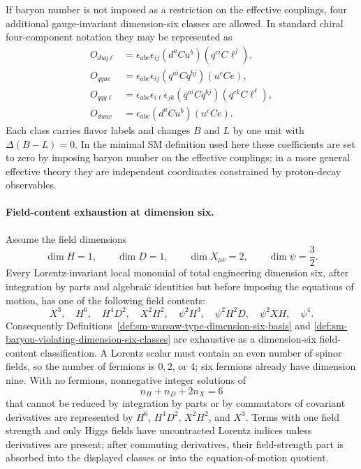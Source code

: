 \begin{definition}
\label{def:sm-baryon-violating-dimension-six-classes}
If baryon number is not imposed as a restriction on the effective couplings,
four additional gauge-invariant dimension-six classes are allowed.  In
standard chiral four-component notation they may be represented as
\[
\begin{aligned}
  O_{duq\ell}&=
  \epsilon_{abc}\epsilon_{ij}
  (d^a C u^b)(q^{ci}C\ell^j),\\
  O_{qque}&=
  \epsilon_{abc}\epsilon_{ij}
  (q^{ai}Cq^{bj})(u^cCe),\\
  O_{qqq\ell}&=
  \epsilon_{abc}\epsilon_{i\ell}\epsilon_{jk}
  (q^{ai}Cq^{bj})(q^{ck}C\ell^\ell),\\
  O_{duue}&=
  \epsilon_{abc}(d^aCu^b)(u^cCe).
\end{aligned}
\]
Each class carries flavor labels and changes \(B\) and \(L\) by one unit
with \(\Delta(B-L)=0\).  In the minimal SM definition used here these
coefficients are set to zero by imposing baryon number on the effective
couplings; in a more general effective theory they are independent
coordinates constrained by proton-decay observables.
\end{definition}

\paragraph{Field-content exhaustion at dimension six.}
Assume the field dimensions
\[
  \dim H=1,\qquad \dim D=1,\qquad \dim X_{\mu\nu}=2,\qquad
  \dim\psi=\frac32 .
\]
Every Lorentz-invariant local monomial of total engineering dimension six,
after integration by parts and algebraic identities but before imposing the
equations of motion, has one of the following field contents:
\[
  X^3,\quad H^6,\quad H^4D^2,\quad X^2H^2,\quad
  \psi^2H^3,\quad \psi^2H^2D,\quad \psi^2XH,\quad \psi^4 .
\]
Consequently Definitions~\ref{def:sm-warsaw-type-dimension-six-basis} and
\ref{def:sm-baryon-violating-dimension-six-classes} are exhaustive as a
dimension-six field-content classification.
A Lorentz scalar must contain an even number of spinor fields, so the number
of fermions is \(0,2\), or \(4\); six fermions already have dimension nine.
With no fermions, nonnegative integer solutions of
\[
  n_H+n_D+2n_X=6
\]
that cannot be reduced by integration by parts or by commutators of
covariant derivatives are represented by \(H^6\), \(H^4D^2\), \(X^2H^2\),
and \(X^3\).  Terms with one field strength and only Higgs fields have
uncontracted Lorentz indices unless derivatives are present; after commuting
derivatives, their field-strength part is absorbed into the displayed
classes or into the equation-of-motion quotient.


